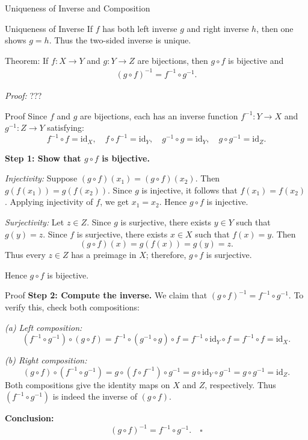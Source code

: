 \documentclass[11pt,aspectratio=43,ignorenonframetext,t]{beamer}
\begin{document}
\begin{frame}{Uniqueness of Inverse and Composition}
\begin{block}{Uniqueness of Inverse}
    If \(f\) has both left inverse \(g\) and right inverse \(h\), then one shows \(g = h\).  
Thus the two-sided inverse is unique.
\end{block}

\smallskip
\begin{block}{Theorem:} If \(f: X \to Y\) and \(g: Y \to Z\) are bijections, then \(g \circ f\) is bijective and
\begin{align*}
(g \circ f)^{-1} = f^{-1} \circ g^{-1}.
\end{align*}

\emph{Proof:} ??? 
    
\end{block}
\end{frame}

\begin{frame}{Proof}
    Since \(f\) and \(g\) are bijections, each has an inverse function \(f^{-1}: Y \to X\) and \(g^{-1}: Z \to Y\) satisfying:
\[
f^{-1} \circ f = \mathrm{id}_X, \quad f \circ f^{-1} = \mathrm{id}_Y, \quad 
g^{-1} \circ g = \mathrm{id}_Y, \quad g \circ g^{-1} = \mathrm{id}_Z.
\]

\textbf{Step 1: Show that \(g \circ f\) is bijective.}

\emph{Injectivity:}  
Suppose \((g\circ f)(x_1) = (g\circ f)(x_2)\).  
Then \(g(f(x_1)) = g(f(x_2))\).  
Since \(g\) is injective, it follows that \(f(x_1)=f(x_2)\).  
Applying injectivity of \(f\), we get \(x_1 = x_2\).  
Hence \(g\circ f\) is injective.

\emph{Surjectivity:}  
Let \(z \in Z\).  
Since \(g\) is surjective, there exists \(y \in Y\) such that \(g(y)=z\).  
Since \(f\) is surjective, there exists \(x \in X\) such that \(f(x)=y\).  
Then
\[
(g\circ f)(x) = g(f(x)) = g(y) = z.
\]
Thus every \(z \in Z\) has a preimage in \(X\); therefore, \(g\circ f\) is surjective.

Hence \(g\circ f\) is bijective.

\end{frame}
\begin{frame}{Proof}
\textbf{Step 2: Compute the inverse.}
We claim that \((g\circ f)^{-1} = f^{-1} \circ g^{-1}.\) To verify this, check both compositions:

\emph{(a) Left composition:}
\[
(f^{-1} \circ g^{-1}) \circ (g \circ f)
= f^{-1} \circ (g^{-1} \circ g) \circ f
= f^{-1} \circ \mathrm{id}_Y \circ f
= f^{-1} \circ f
= \mathrm{id}_X.
\]

\emph{(b) Right composition:}
\[
(g \circ f) \circ (f^{-1} \circ g^{-1})
= g \circ (f \circ f^{-1}) \circ g^{-1}
= g \circ \mathrm{id}_Y \circ g^{-1}
= g \circ g^{-1}
= \mathrm{id}_Z.
\]
Both compositions give the identity maps on \(X\) and \(Z\), respectively. Thus \((f^{-1} \circ g^{-1})\) is indeed the inverse of \((g \circ f)\).

\textbf{Conclusion:}
\[
(g \circ f)^{-1} = f^{-1} \circ g^{-1}. \quad \square
\]
\end{frame}
\end{document}
